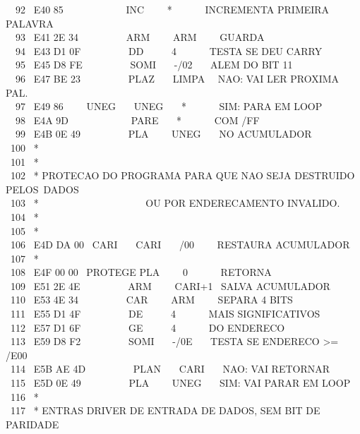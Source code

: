 \documentclass[a4paper,12pt]{article}
\begin{document}
\phantom \ \ 92 \ E40 85 \ \ \ \ \ \ \ \ \ \ \ \ INC \ \ \ \ * \ \ \ \ \ \ INCREMENTA PRIMEIRA PALAVRA\\
\phantom \ \ 93 \ E41 2E 34 \ \ \ \ \ \ \ \ \ ARM \ \ \ \ ARM \ \ \ \ GUARDA\\
\phantom \ \ 94 \ E43 D1 0F \ \ \ \ \ \ \ \ \ DD \ \ \ \ \ 4 \ \ \ \ \ \ TESTA SE DEU CARRY\\
\phantom \ \ 95 \ E45 D8 FE \ \ \ \ \ \ \ \ \ SOMI \ \ \ -/02 \ \ \ ALEM DO BIT 11\\
\phantom \ \ 96 \ E47 BE 23 \ \ \ \ \ \ \ \ \ PLAZ \ \ \ LIMPA \ \ NAO: VAI LER PROXIMA PAL.\\
\phantom \ \ 97 \ E49 86 \ \ \ \ UNEG \ \ \ UNEG \ \ \ * \ \ \ \ \ \ SIM: PARA EM LOOP\\
\phantom \ \ 98 \ E4A 9D \ \ \ \ \ \ \ \ \ \ \ \ PARE \ \ \ * \ \ \ \ \ \ COM /FF\\
\phantom \ \ 99 \ E4B 0E 49 \ \ \ \ \ \ \ \ \ PLA \ \ \ \ UNEG \ \ \ NO ACUMULADOR\\
\phantom \ 100 \ *\\
\phantom \ 101 \ *\\
\phantom \ 102 \ * PROTECAO DO PROGRAMA PARA QUE NAO SEJA DESTRUIDO PELOS\,\,\,DADOS\\
\phantom \ 103 \ * \ \ \ \ \ \ \ \ \ \ \ \ \ \ \ \ \ \ \ \ \ OU POR ENDERECAMENTO INVALIDO.\\
\phantom \ 104 \ *\\
\phantom \ 105 \ *\\
\phantom \ 106 \ E4D DA 00 \ CARI \ \ \ CARI \ \ \ /00 \ \ \ \ RESTAURA ACUMULADOR\\
\phantom \ 107 \ *\\
\phantom \ 108 \ E4F 00 00 \ PROTEGE PLA \ \ \ \ 0 \ \ \ \ \ \ RETORNA\\
\phantom \ 109 \ E51 2E 4E \ \ \ \ \ \ \ \ \ ARM \ \ \ \ CARI+1 \ SALVA ACUMULADOR\\
\phantom \ 110 \ E53 4E 34 \ \ \ \ \ \ \ \ \ CAR \ \ \ \ ARM \ \ \ \ SEPARA 4 BITS\\
\phantom \ 111 \ E55 D1 4F \ \ \ \ \ \ \ \ \ DE \ \ \ \ \ 4 \ \ \ \ \ \ MAIS SIGNIFICATIVOS\\
\phantom \ 112 \ E57 D1 6F \ \ \ \ \ \ \ \ \ GE \ \ \ \ \ 4 \ \ \ \ \ \ DO ENDERECO\\
\phantom \ 113 \ E59 D8 F2 \ \ \ \ \ \ \ \ \ SOMI \ \ \ -/0E \ \ \ TESTA SE ENDERECO >= /E00\\
\phantom \ 114 \ E5B AE 4D \ \ \ \ \ \ \ \ \ PLAN \ \ \ CARI \ \ \ NAO: VAI RETORNAR\\
\phantom \ 115 \ E5D 0E 49 \ \ \ \ \ \ \ \ \ PLA \ \ \ \ UNEG \ \ \ SIM: VAI PARAR EM LOOP\\
\phantom \ 116 \ *\\
\phantom \ 117 \ * ENTRAS DRIVER DE ENTRADA DE DADOS, SEM BIT DE PARIDADE
 
\end{document}
